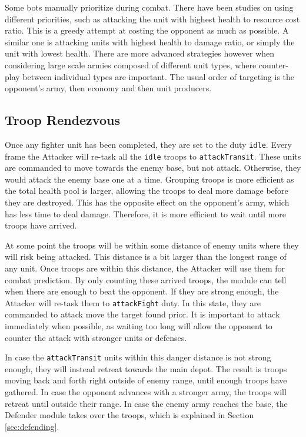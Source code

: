 	Some bots manually prioritize during combat. There have been studies on using different priorities, such as attacking the unit with highest health to resource cost ratio. This is a greedy attempt at costing the opponent as much as possible. A similar one is attacking units with highest health to damage ratio, or simply the unit with lowest health. There are more advanced strategies however when considering large scale armies composed of different unit types, where counter-play between individual types are important. The usual order of targeting is the opponent's army, then economy and then unit producers.
	
	\subsection*{Troop Rendezvous}
	Once any fighter unit has been completed, they are set to the duty \texttt{idle}. Every frame the Attacker will re-task all the \texttt{idle} troops to \texttt{attackTransit}. These units are commanded to move towards the enemy base, but not attack. Otherwise, they would attack the enemy base one at a time. Grouping troops is more efficient as the total health pool is larger, allowing the troops to deal more damage before they are destroyed. This has the opposite effect on the opponent's army, which has less time to deal damage. Therefore, it is more efficient to wait until more troops have arrived.
		
	At some point the troops will be within some distance of enemy units where they will risk being attacked. This distance is a bit larger than the longest range of any unit. Once troops are within this distance, the Attacker will use them for combat prediction. By only counting these arrived troops, the module can tell when there are enough to beat the opponent. If they are strong enough, the Attacker will re-task them to \texttt{attackFight} duty. In this state, they are commanded to attack move the target found prior. It is important to attack immediately when possible, as waiting too long will allow the opponent to counter the attack with stronger units or defenses.
	
	In case the \texttt{attackTransit} units within this danger distance is not strong enough, they will instead retreat towards the main depot. The result is troops moving back and forth right outside of enemy range, until enough troops have gathered. In case the opponent advances with a stronger army, the troops will retreat until outside their range. In case the enemy army reaches the base, the Defender module takes over the troops, which is explained in Section \ref{sec:defending}.
	
